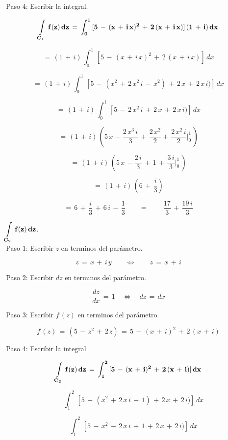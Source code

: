 \documentclass[a4paper,11pt,openany]{book}
\begin{document}
\textcolor{ao(english)}{\,Paso 4:} Escribir la integral.

$$\bf{\displaystyle\int\limits_{C_{1}}\,f(z)\,dz}\,=\,\displaystyle\int_{0}^{1}\,[5\,-\,(x\,+\,i\,x)^{2}\,+\,2\,(x\,+\,i\,x)]\,(1\,+\,i)\,dx$$

$$=\,(1\,+\,i)\,\displaystyle\int_{0}^{1}\,[5\,-\,(x\,+\,i\,x)^{2}\,+\,2\,(x\,+\,i\,x)]\,dx$$

$$=\,(1\,+\,i)\,\displaystyle\int_{0}^{1}\,[5\,-\,(x^{2}\,+\,2\,x^{2}\,i\,-\,x^{2})\,+\,2\,x\,+\,2\,x\,i)]\,dx$$

$$=\,(1\,+\,i)\,\displaystyle\int_{0}^{1}\,[5\,-\,2\,x^{2}\,i\,+\,2\,x\,+\,2\,x\,i)]\,dx$$

$$=\,(1\,+\,i)\,\left(5\,x\,-\dfrac{2\,x^{3}\,i}{3}\,+\,\dfrac{2\,x^{2}}{2}+\,\dfrac{2\,x^{2}\,i}{2}\bigg|_{0}^{1}\,\right)$$

$$=\,(1\,+\,i)\,\left(5\,x\,-\dfrac{2\,i}{3}\,+\,1\,+\,\dfrac{3\,i}{3}\bigg|_{0}^{1}\,\right)$$

$$=\,(1\,+\,i)\,\left(6\,+\,\dfrac{i}{3}\right)$$

$$=\,6\,+\,\dfrac{i}{3}\,+\,6\,i\,-\,\dfrac{1}{3} \qquad=\qquad\,\dfrac{17}{3}\,+\,\dfrac{19\,i}{3}$$

$\bf{\displaystyle\int\limits_{C_{2}}\,f(z)\,dz}$.\\

\textcolor{ao(english)}{\,Paso 1:} Escribir $z$ en terminos del parámetro.

$$z\,=\,x\,+\,i\,y \qquad\iff\qquad z\,=\,x\,+\,i$$

\textcolor{ao(english)}{\,Paso 2:} Escribir $dz$ en terminos del parámetro.

$$\dfrac{dz}{dx}\,=\,1 \quad\iff\quad dz\,=\,dx$$

\textcolor{ao(english)}{\,Paso 3:} Escribir $f\,(z)$ en terminos del parámetro.

$$f\,(z)\,=\,(5\,-\,z^{2}\,+\,2\,z)\,=\,5\,-\,(x\,+\,i)^{2}\,+\,2\,(x\,+\,i)$$

\textcolor{ao(english)}{\,Paso 4:} Escribir la integral.

$$\bf{\displaystyle\int\limits_{C_{2}}\,f(z)\,dz}\,=\,\displaystyle\int_{1}^{2}\,[5\,-\,(x\,+\,i)^{2}\,+\,2\,(x\,+\,i)]\,dx$$

$$=\,\displaystyle\int_{1}^{2}\,[5\,-\,(x^{2}\,+\,2\,x\,i\,-\,1)\,+\,2\,x\,+\,2\,i)]\,dx$$

$$=\,\displaystyle\int_{1}^{2}\,[5\,-\,x^{2}\,-\,2\,x\,i\,+\,1\,+\,2\,x\,+\,2\,i)]\,dx$$
\end{document}
